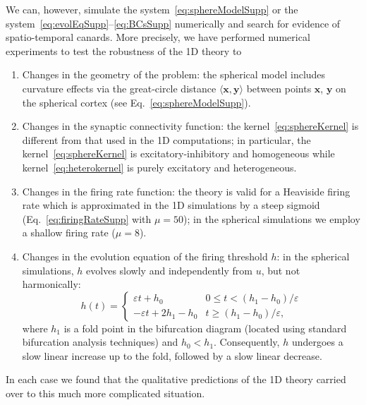 \documentclass[aps,prl,reprint,superscriptaddress]{revtex4-1}
\newcommand{\epsi}{\varepsilon}
\newcommand{\vect}[1]{\ensuremath{\bm #1}}
\begin{document}
We can, however, simulate the system~\eqref{eq:sphereModelSupp} or the
system~\eqref{eq:evolEqSupp}--\eqref{eq:BCsSupp} numerically and search for evidence of spatio-temporal
canards. More precisely, we have performed numerical experiments to test the
robustness of the 1D theory to
\begin{enumerate}
  \item Changes in the geometry of the problem: the spherical model includes
    curvature effects via the great-circle distance $\langle \vect{x}, \vect{y} \rangle$
    between points $\vect{x}$, $\vect{y}$ on the spherical cortex (see
    Eq.~\eqref{eq:sphereModelSupp}).
  \item Changes in the synaptic connectivity function: the
    kernel~\eqref{eq:sphereKernel} is different from that used in the 1D
    computations; in particular, the kernel~\eqref{eq:sphereKernel} is
    excitatory-inhibitory and homogeneous while kernel~\eqref{eq:heterokernel} is
    purely excitatory and heterogeneous.
  \item Changes in the firing rate function: the theory is valid for a Heaviside
    firing rate which is approximated in the 1D simulations by a steep
    sigmoid (Eq.~\eqref{eq:firingRateSupp} with $\mu=50$); in the spherical simulations
    we employ a shallow firing rate ($\mu = 8$).
  \item Changes in the evolution equation of the firing threshold $h$: in the
    spherical simulations, $h$ evolves slowly and independently from $u$, but not
    harmonically:
    \begin{equation}\label{eq:hEvolution}
      h(t) = 
      \begin{cases}
	\epsi t + h_0           & 0 \leq t    < (h_1 - h_0)/\epsi \\
	-\epsi t + 2h_1 - h_0   & t \geq (h_1 - h_0)/\epsi,
      \end{cases}
    \end{equation}
    where $h_1$ is a fold point in the bifurcation diagram (located using standard
    bifurcation analysis techniques) and $h_0<h_1$. Consequently, $h$ undergoes a
    slow linear increase up to the fold, followed by a slow linear decrease.
\end{enumerate}
In each case we found that the qualitative predictions of the 1D theory carried over to this
much more complicated situation.
%
\end{document}
